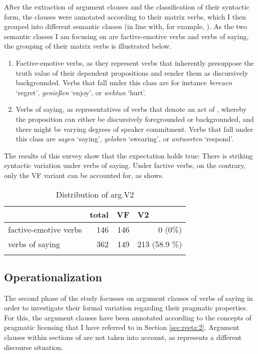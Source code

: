 \documentclass[output=paper,colorlinks,citecolor=brown]{langscibook}
\begin{document}
After the extraction of argument clauses and the classification of their syntactic form, the clauses were annotated according to their matrix verbs, which I then grouped into different semantic classes (in line with, for example, \citealt{Petrova2020a}). As the two semantic classes I am focusing on are factive-emotive verbs and verbs of saying, the grouping of their matrix verbs is illustrated below.

\begin{enumerate}
\item Factive-emotive verbs, as they represent verbs that inherently presuppose the truth value of their dependent propositions and render them as discursively backgrounded. Verbs that fall under this class are for instance \textit{bereuen} `regret', \textit{genießen} ‘enjoy', or \textit{wehtun} `hurt'.
\item Verbs of saying, as representatives of verbs that denote an act of , whereby the proposition can either be discursively foregrounded or backgrounded, and there might be varying degrees of speaker commitment. Verbs that fall under this class are \textit{sagen} ‘saying', \textit{geloben} `swearing', or \textit{antworten} ‘respond'.
\end{enumerate}

The results of this survey show that the expectation holds true: There is striking syntactic variation under verbs of saying. Under factive verbs, on the contrary, only the VF variant can be accounted for, as  shows.

\begin{table}
\caption{Distribution of arg.V2}
\label{tab:myname:frequencies}
 \begin{tabularx}{.65\textwidth}{lrrr}
  \lsptoprule
& \multicolumn{1}{l}{total} & \multicolumn{1}{l}{VF}  & \multicolumn{1}{l}{V2} \\
  \midrule
factive-emotive verbs   &   146  &    146  &    0 (0\%) \\
 verbs of saying & 362 &   149  &   213 (58.9 \%) \\
  \lspbottomrule
 \end{tabularx}
\end{table}

\subsection{Operationalization}\label{sec:reetz:4.3}
The second phase of the study focusses on argument clauses of verbs of saying in order to investigate their formal variation regarding their pragmatic properties. For this, the argument clauses have been annotated according to the concepts of pragmatic licensing that I have referred to in Section \ref{sec:reetz:2}. Argument clauses within sections of  are not taken into account, as  represents a different discourse situation.
\end{document}
